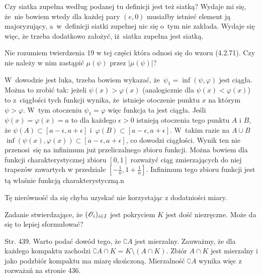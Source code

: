\documentclass[a4paper,11pt]{article}
\begin{document}
\vspace{\spaceFour}


\start {} Czy siatka zupełna według podanej tu definicji jest
też siatką? Wydaje mi się, że~nie bowiem wtedy dla każdej pary
$(e, 0)$ musiałby istnieć element ją majoryzujący, a~w~definicji
siatki zupełnej nic się o~tym nie zakłada. Wydaje się więc, że trzeba
dodatkowo założyć, iż~siatka zupełna jest siatką.

\vspace{\spaceFour}


\start {} Nie rozumiem twierdzenia 19 w tej części która odnosi
się do wzoru (4.2.71). Czy nie należy w nim zastąpić $\mu( \psi )$
przez $| \mu( \psi ) |$?

\vspace{\spaceFour}


\start {} W~dowodzie jest luka, trzeba bowiem wykazać,
że~$\psi_{ 1 } = \inf( \psi, \varphi )$ jest ciągła. Można to zrobić
tak: jeżeli $\psi( x ) > \varphi( x )$ (analogicznie dla
$\psi( x ) < \varphi( x )$) to z~ciągłości tych funkcji wynika,
że~istnieje otoczenie punktu $x$ na którym $\psi > \varphi$. W~tym
otoczeniu $\psi_{ 1 } = \varphi$ więc funkcja ta jest ciągła. Jeśli
$\psi( x ) = \varphi( x ) = a$ to dla każdego $\epsilon > 0$ istnieją
otoczenia tego punktu $A$ i $B$, że
$\psi( A ) \subset [ a - \epsilon, a + \epsilon ]$
i~$\varphi( B ) \subset [ a - \epsilon, a + \epsilon ]$. W~takim razie
na $A \cup B$
$\inf( \psi( x ), \varphi( x ) ) \subset [ a - \epsilon, a + \epsilon
]$, co dowodzi ciągłości. Wynik ten nie przenosi~się na infinimum już
przeliczalnego zbioru funkcji. Można bowiem dla funkcji
charakterystycznej zbioru $[0, 1]$ rozważyć ciąg zmierzających do niej
trapezów zawartych w przedziale
$[-\frac{ 1 }{ n }, 1 + \frac{ 1 }{ n } ]$. Infinimum tego zbioru
funkcji jest tą właśnie funkcją charakterystyczną.n

\vspace{\spaceFour}


\start {} Tę nierówność da się chyba uzyskać nie korzystając z
dodatniości miary.

\vspace{\spaceFour}


\start {} Zadanie stwierdzające, że
$( \mathcal{O}_{ i } )_{ i \in I }$ jest pokryciem $K$ jest dość niezręczne.
Może da się to lepiej sformułować?

\start Str. 439. Warto podać dowód tego, że $\complement A$ jest
mierzalny. Zauważmy, że dla każdego kompaktu zachodzi
$\complement A \cap K = K \setminus ( A \cap K )$. Zbiór $A \cap K$
jest mierzalny i jako podzbiór kompaktu ma miarę skończoną.
Mierzalność $\complement A$ wynika więc z rozważań na stronie 436.
\end{document}
